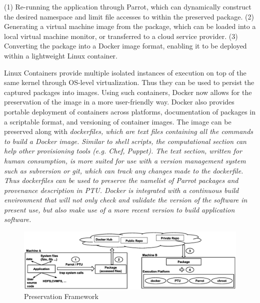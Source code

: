 (1) Re-running the application through Parrot, which can dynamically construct
the desired namespace and limit file accesses to within the preserved package.
(2) Generating a virtual machine image from the package, which can be loaded
into a local virtual machine monitor, or transferred to a cloud service provider.
(3) Converting the package into a Docker image format, enabling it to be
deployed within a lightweight Linux container.

\vspace{5pt}
Linux Containers provide multiple isolated instances of execution on top of the same kernel through OS-level virtualization. Thus they can be used to persist the captured packages into images. Using such containers, Docker now allows for the preservation of the image in a more user-friendly way. Docker also provides portable deployment of containers across platforms, documentation of packages in a scriptable format, and versioning of container images. The image can be preserved along with \em{dockerfiles}, which are text files containing all the commands to build a Docker image. Similar to shell scripts, the computational section can help other provisioning tools (e.g. Chef, Puppet).  The text section, written for human consumption, is more suited for use with a version management system such as subversion or git, which can track any changes made to the dockerfile. Thus dockerfiles can be used to preserve the namelist of Parrot packages and provenance description in PTU. Docker is integrated with a continuous build environment that will not only check and validate the version of the software in present use, but also make use of a more recent version to build application software.

\begin{figure}
\centering
\includegraphics[width=1.0\textwidth]{preservation_framework.eps}
\caption{Preservation Framework}
\label{fig: preservation_framework}
\end{figure}

